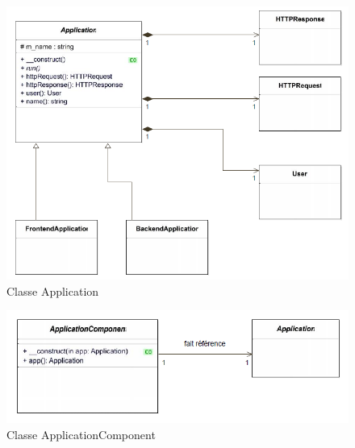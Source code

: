     \begin{figure}[h]
        \begin{center}
            \includegraphics[scale=0.9]{images/uml/classes/Application.png} 
        \end{center}

        \caption{Classe Application}
        \label{Classe Application}
    \end{figure}


    \begin{figure}[h]
        \begin{center}
            \includegraphics[scale=1.0]{images/uml/classes/ApplicationComponent.png} 
        \end{center}

        \caption{Classe ApplicationComponent}
        \label{Classe ApplicationComponent}
    \end{figure}


